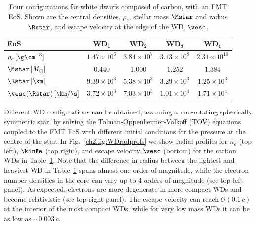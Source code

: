 \begin{table}[t]
  \centering
    \begin{tabular}{ l c c c c}
    \toprule
      \textbf{EoS} & \textbf{WD}$_\mathbf{1}$  & \textbf{WD}$_\mathbf{2}$&\textbf{WD}$_\mathbf{3}$ &\textbf{WD}$_\mathbf{4}$\\
      \midrule\midrule
     $\rho_c\,[\g\cm^{-3}]$ &  $1.47\times 10^{6}$ & $3.84\times 10^{7} $ & $3.13\times 10^{8}$ & $2.31\times 10^{10}$\\
     $\Mstar\,[M_\odot]$ & $0.440$ &  $1.000 $ & $1.252$ & $1.384$\\
     $\Rstar\,[\km]$ & $9.39\times 10^{3}$ &  $5.38\times 10^{3}$ & $3.29\times 10^3$ & $1.25\times 10^3$\\
     $\vesc(\Rstar) \, [\km/\s]$ & $3.72\times 10^{3}$ & $7.03\times 10^{3}$ & $1.01\times 10^{4}$ & $1.71\times 10^{4}$ \\
      \bottomrule
    \end{tabular}
  \caption{Four configurations for white dwarfs composed of carbon, with an FMT EoS. Shown are the central densities, $\rho_c$, stellar mass $\Mstar$ and radius $\Rstar$, and escape velocity at the edge of the WD, $\vesc$. }
    \label{ch2:tab:WDs}
\end{table}
 


Different WD configurations can be obtained, assuming a non-rotating spherically symmetric star, by solving the
Tolman-Oppenheimer-Volkoff (TOV) equations~\cite{Tolman:1939jz_StaticSolutionsEinstein,Oppenheimer:1939ne_MassiveNeutronCores} coupled to the FMT EoS with different initial conditions for the pressure at the centre of the star. In Fig.~\ref{ch2:fig:WDradprofs} we show radial profiles for $n_e$ (top left), $\kinFe$ (top right), and escape velocity $\vesc$ (bottom) for the carbon WDs in Table~\ref{ch2:tab:WDs}. Note that the difference in radius between the lightest and heaviest WD in Table~\ref{ch2:tab:WDs} spans almost one order of magnitude, while the electron number densities in the core can vary up to 4 orders of magnitude (see top left panel). As expected, electrons are more degenerate in more compact WDs and become relativistic (see top right panel). The escape velocity can reach ${\mathcal{O}}(0.1\,c)$ at the interior of the most compact WDs, while for very low mass WDs 
it can be as low as $\sim0.003\,c$. 

